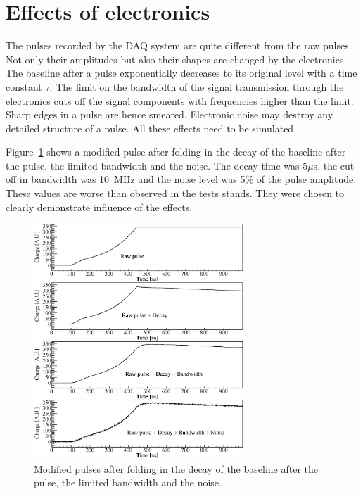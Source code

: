  
\section{Effects of electronics} 
\label{sec:pss:dbn} 
The pulses recorded by the DAQ system are quite different from the raw
pulses. Not only their amplitudes but also their shapes are changed
by the electronics. The baseline after a pulse exponentially
decreases to its original level with a time constant $\tau$. The limit
on the bandwidth of the signal transmission through the electronics
cuts off the signal components with frequencies higher than the
limit. Sharp edges in a pulse are hence smeared. Electronic noise may
destroy any detailed structure of a pulse. All these effects need to
be simulated.
 
Figure~\ref{fig:pss:elec} shows a modified pulse after folding in the
decay of the baseline after the pulse, the limited bandwidth and the
noise. The decay time was $5 \mu$s, the cut-off in bandwidth was
10~MHz and the noise level was 5\% of the pulse amplitude. These
values are worse than observed in the tests stands. They were chosen
to clearly demonstrate influence of the effects.
\begin{figure}[htbp] 
\centering 
\includegraphics[width=0.7\textwidth]{PSDBN} 
\caption{Modified pulses after folding in the decay of the baseline
after the pulse, the limited bandwidth and the noise.}
\label{fig:pss:elec} 
\end{figure}
 
 
